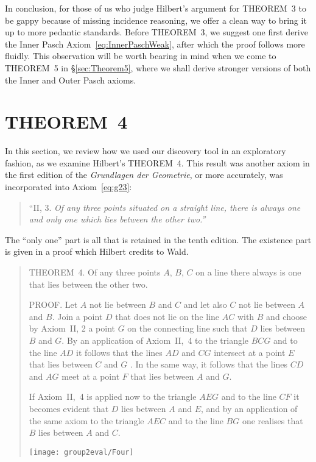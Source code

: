 In conclusion, for those of us who judge Hilbert's argument for THEOREM~3 to be gappy because of missing incidence reasoning, we offer a clean way to bring it up to more pedantic standards. Before THEOREM~3, we suggest one first derive the Inner Pasch Axiom~\eqref{eq:InnerPaschWeak}, after which the proof follows more fluidly. This observation will be worth bearing in mind when we come to THEOREM~5 in \S\ref{sec:Theorem5}, where we shall derive stronger versions of both the Inner and Outer Pasch axioms.

\section{THEOREM~4}
In this section, we review how we used our discovery tool in an exploratory fashion, as we examine Hilbert's THEOREM~4. This result was another axiom in the first edition of the \emph{Grundlagen der Geometrie}, or more accurately, was incorporated into Axiom~\ref{eq:g23}:
\begin{quote}
  ``II, 3. \emph{Of any three points situated on a straight line, there is always one and only one which lies between the other two.''}
\end{quote}

The ``only one'' part is all that is retained in the tenth edition. The existence part is given in a proof which Hilbert credits to Wald.
\begin{quotation}
  THEOREM~4. Of any three points $A$, $B$, $C$ on a line there always is one that lies between the other two.

  PROOF. Let $A$ not lie between $B$ and $C$ and let also $C$ not lie between $A$ and $B$. Join a point $D$ that does not lie on the line $AC$ with $B$ and choose by Axiom~II, 2 a point $G$ on the connecting line such that $D$ lies between $B$ and $G$. By an application of Axiom~II,~4 to the triangle $BCG$ and to the line $AD$ it follows that the lines $AD$ and $CG$ intersect at a point $E$ that lies between $C$ and $G$ . In the same way, it follows that the lines $CD$ and $AG$ meet at a point $F$ that lies between $A$ and $G$.

If Axiom~II,~4 is applied now to the triangle $AEG$ and to the line $CF$ it becomes evident that $D$ lies between $A$ and $E$, and by an application of the same axiom to the triangle $AEC$ and to the line $BG$ one realises that $B$ lies between $A$ and $C$.

\centering \texttt{[image: group2eval/Four]}
\end{quotation}

